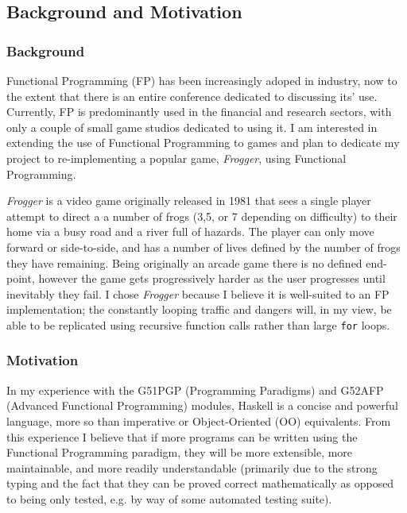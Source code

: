 \documentclass[10pt]{article}
\begin{document}
\maketitle

\subsection*{Background and Motivation}
\subsubsection*{Background}
Functional Programming (FP) has been increasingly adoped in industry, now to the extent that there is an entire conference dedicated to discussing its' use\cite{cufp}.
Currently, FP is predominantly used in the financial and research sectors, with only a couple of small game studios dedicated to using it.
I am interested in extending the use of Functional Programming to games and plan to dedicate my project to re-implementing a popular game, \textit{Frogger}, using Functional Programming.

\textit{Frogger} is a video game originally released in 1981 that sees a single player attempt to direct a a number of frogs (3,5, or 7 depending on difficulty) to their home via a busy road and a river full of hazards.
The player can only move forward or side-to-side, and has a number of lives defined by the number of frogs they have remaining.
Being originally an arcade game there is no defined end-point, however the game gets progressively harder as the user progresses until inevitably they fail.
I chose \textit{Frogger} because I believe it is well-suited to an FP implementation; the constantly looping traffic and dangers will, in my view, be able to be replicated using recursive function calls rather than large \verb|for| loops.

\subsubsection*{Motivation}
In my experience with the G51PGP (Programming Paradigms) and G52AFP (Advanced Functional Programming) modules, Haskell is a concise and powerful language, more so than imperative or Object-Oriented (OO) equivalents.
From this experience I believe that if more programs can be written using the Functional Programming paradigm, they will be more extensible, more maintainable, and more readily understandable (primarily due to the strong typing and the fact that they can be proved correct mathematically as opposed to being only tested, e.g. by way of some automated testing suite).
\end{document}

